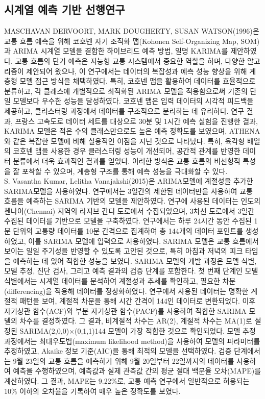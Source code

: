 \documentclass[11pt]{report}
\begin{document}
\subsection{시계열 예측 기반 선행연구}
MASCHAVAN DERVOORT, MARK DOUGHERTY, SUSAN WATSON(1996)은 교통 흐름 예측을 위해 코호넨 자기 조직화 맵(Kohonen Self-Organizing Map, SOM)과 ARIMA 시계열 모델을 결합한 하이브리드 예측 방법, 일명 KARIMA를 제안하였다. 
교통 흐름의 단기 예측은 지능형 교통 시스템에서 중요한 역할을 하며, 다양한 알고리즘이 제안되어 왔으나, 이 연구에서는 데이터의 복잡성과 예측 성능 향상을 위해 계층형 모델 접근 방식을 채택하였다. 
특히, 코호넨 맵을 활용하여 데이터를 효율적으로 분류하고, 각 클래스에 개별적으로 최적화된 ARIMA 모델을 적용함으로써 기존의 단일 모델보다 우수한 성능을 달성하였다. 
코호넨 맵은 입력 데이터의 시각적 피드백을 제공하고, 클러스터링 과정에서 데이터를 구조적으로 분리하는 데 유리하다. 
연구 결과, 프랑스 고속도로 데이터 세트를 대상으로 30분 및 1시간 예측 실험을 진행한 결과, KARIMA 모델은 적은 수의 클래스만으로도 높은 예측 정확도를 보였으며, ATHENA와 같은 복잡한 모델에 비해 실용적인 이점을 지닌 것으로 나타났다. 
특히, 육각형 배열의 코호넨 맵을 사용한 경우 클러스터링 성능이 개선되어, 공간적 관계를 반영한 데이터 분류에서 더욱 효과적인 결과를 얻었다. 
이러한 방식은 교통 흐름의 비선형적 특성을 잘 포착할 수 있으며, 계층형 구조를 통해 예측 성능을 극대화할 수 있다. \\
\indent S. Vasantha Kumar, Lelitha Vanajakshi(2015)은 ARIMA모델에 계절성을 추가한 SARIMA모델을 사용하였다. 
연구에서는 3일간의 제한된 데이터만을 사용하여 교통 흐름을 예측하는 SARIMA 기반의 모델을 제안하였다. 
연구에 사용된 데이터는 인도의 첸나이(Chennai) 지역의 라지브 간디 도로에서 수집되었으며, 3차선 도로에서 3일간 수집된 데이터를 기반으로 모델을 구축하였다. 
연구에서는 하루 24시간 동안 수집된 1분 단위의 교통량 데이터를 10분 간격으로 집계하여 총 144개의 데이터 포인트를 생성하였고, 이를 SARIMA 모델에 입력으로 사용하였다. 
SARIMA 모델은 교통 흐름에서 보이는 일일 주기성을 반영할 수 있도록 고안된 것으로, 특히 아침과 저녁의 피크 타임을 예측하는 데 있어 적합한 성능을 보였다.
SARIMA 모델의 개발 과정은 모델 식별, 모델 추정, 진단 검사, 그리고 예측 결과의 검증 단계를 포함한다. 첫 번째 단계인 모델 식별에서는 시계열 데이터를 분석하여 계절성과 추세를 확인하고, 필요한 차분(differencing)을 적용해 데이터를 정상화하였다. 
연구에서 사용된 데이터는 명확한 계절적 패턴을 보여, 계절적 차분을 통해 시간 간격이 144인 데이터로 변환되었다. 
이후 자기상관 함수(ACF)와 부분 자기상관 함수(PACF)를 사용하여 적합한 SARIMA 모델의 차수를 결정하였다. 
그 결과, 비계절적 차수는 AR(2), 계절적 차수는 MA(1)로 설정된 SARIMA(2,0,0)×(0,1,1)144 모델이 가장 적합한 것으로 확인되었다.
모델 추정 과정에서는 최대우도법(maximum likelihood method)을 사용하여 모델의 파라미터를 추정하였고, Akaike 정보 기준(AIC)을 통해 최적의 모델을 선택하였다. 
검증 단계에서는 9월 23일의 교통 흐름을 예측하기 위해 9월 20일부터 22일까지의 데이터를 사용하여 예측을 수행하였으며, 예측값과 실제 관측값 간의 평균 절대 백분율 오차(MAPE)를 계산하였다. 
그 결과, MAPE는 9.22\%로, 교통 예측 연구에서 일반적으로 허용되는 10\% 이하의 오차율을 기록하여 매우 높은 정확도를 보였다. 
\end{document}
